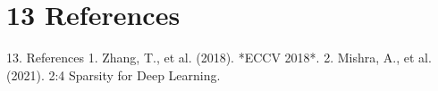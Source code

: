 \section{13 References}

 13. References
1. Zhang, T., et al. (2018). *ECCV 2018*.
2. Mishra, A., et al. (2021). 2:4 Sparsity for Deep Learning.
